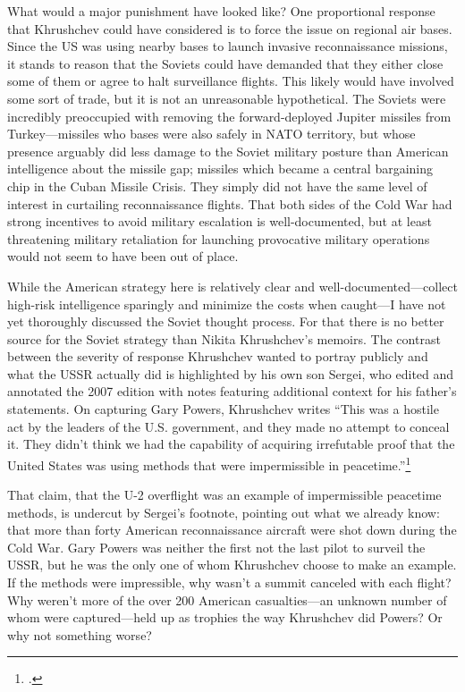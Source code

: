 \documentclass{report}
\begin{document}
\begin{refsegment}
What would a major punishment have looked like? One proportional response that Khrushchev could have considered is to force the issue on regional air bases. Since the US was using nearby bases to launch invasive reconnaissance missions, it stands to reason that the Soviets could have demanded that they either close some of them or agree to halt surveillance flights. This likely would have involved some sort of trade, but it is not an unreasonable hypothetical. The Soviets were incredibly preoccupied with removing the forward-deployed Jupiter missiles from Turkey---missiles who bases were also safely in NATO territory, but whose presence arguably did less damage to the Soviet military posture than American intelligence about the missile gap; missiles which became a central bargaining chip in the Cuban Missile Crisis. They simply did not have the same level of interest in curtailing reconnaissance flights. That both sides of the Cold War had strong incentives to avoid military escalation is well-documented, but at least threatening military retaliation for launching provocative military operations would not seem to have been out of place.

While the American strategy here is relatively clear and well-documented---collect high-risk intelligence sparingly and minimize the costs when caught---I have not yet thoroughly discussed the Soviet thought process. For that there is no better source for the Soviet strategy than Nikita Khrushchev's memoirs. The contrast between the severity of response Khrushchev wanted to portray publicly and what the USSR actually did is highlighted by his own son Sergei, who edited and annotated the 2007 edition with notes featuring additional context for his father's statements.  On capturing Gary Powers, Khrushchev writes ``This was a hostile act by the leaders of the U.S. government, and they made no attempt to conceal it. They didn't think we had the capability of \textelp{} acquiring irrefutable proof that the United States was using methods that were impermissible in peacetime.''\footcite[p.~239]{khrushchev_memoirs_2007}

That claim, that the U-2 overflight was an example of impermissible peacetime methods, is undercut by Sergei's footnote, pointing out what we already know: that more than forty American reconnaissance aircraft were shot down during the Cold War. Gary Powers was neither the first not the last pilot to surveil the USSR, but he was the only one of whom Khrushchev choose to make an example. If the methods were impressible, why wasn't a summit canceled with each flight?  Why weren't more of the over 200 American casualties---an unknown number of whom were captured---held up as trophies the way Khrushchev did Powers? Or why not something worse?


\end{refsegment}
\end{document}
